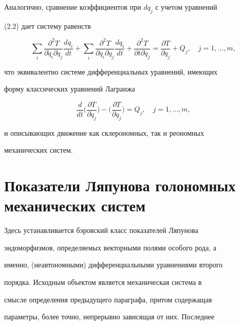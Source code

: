  


Аналогично, сравнение коэффициентов при $d q_j$ с учетом уравнений 


(2.2) дает систему равенств 


$$ 


\sum_i\frac{\partial^2 T}{\partial\Dot q_i\partial\Dot q_j} 


\frac{d\Dot q_i}{dt}+\sum_i 


\frac{\partial^2T}{\partial q_i\partial\Dot q_j} 


\frac{d q_i}{dt}+ 


\frac{\partial^2T}{\partial t\partial\Dot q_j}= 


\frac{\partial T}{\partial q_j}+Q_j,\quad j=1,\dotsc,m, 


$$ 


что эквивалентно системе дифференциальных уравнений, имеющих 


форму классических уравнений Лагранжа 


$$ 


\frac{d}{dt} 


\bigg(\frac{\partial T}{\partial\Dot q_j} \bigg)


-\bigg(\frac{\partial T}{\partial q_j}\bigg)=Q_j,\quad 


j=1,\dotsc,m,


$$ 


и описывающих движение как склерономных, так и реономных 


механических систем. 


 


\section{Показатели Ляпунова голономных механических систем} 


 


Здесь устанавливается бэровский класс показателей Ляпунова 


эндоморфизмов, определяемых векторными полями особого рода, а 


именно, (неавтономными) дифференциальными уравнениями второго 


порядка. Исходным объектом является механическая система в 


смысле определения предыдущего параграфа, притом содержащая 


параметры, более точно, непрерывно зависящая от них. Последнее 


